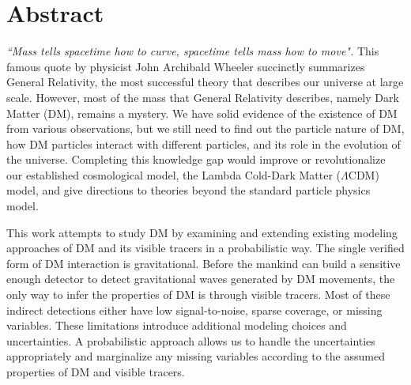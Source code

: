 \documentclass[ucdthesis.tex]{subfiles}
\begin{document}

    \doublespacing
		\section*{Abstract} 

		{\it ``Mass tells spacetime how to curve, spacetime tells mass how to move".}
		This famous quote by physicist John Archibald Wheeler succinctly summarizes General
		Relativity,  the most successful theory that describes our universe
		at large scale. However, most of the mass that General Relativity describes,
		namely Dark Matter (DM), remains a mystery.  
		We have solid evidence of the existence of DM from various
		observations, but we still need to find out the particle nature of DM,  
		how DM particles interact with different particles, and its role in the
		evolution of the universe. Completing this knowledge gap would improve or 
		revolutionalize our established cosmological model,
		the Lambda Cold-Dark Matter	($\Lambda$CDM) model, 
		and give directions to theories beyond the standard particle
		physics model. 

			This work attempts to study DM by examining and
		extending existing modeling approaches of DM and its visible tracers in a
		probabilistic way. The single verified form of 
		DM interaction is gravitational. Before the mankind can build a sensitive 
		enough detector to detect gravitational waves generated by DM movements, the 
		only way to infer the properties of DM is through visible tracers. Most of 
		these indirect detections	either have low signal-to-noise, sparse coverage, 
		or missing
		variables. These limitations introduce additional
		modeling choices and uncertainties. A probabilistic approach allows us to
		handle the uncertainties appropriately and marginalize any 
		missing variables 
		according to the assumed properties of DM and visible tracers. 	
		
\end{document}
